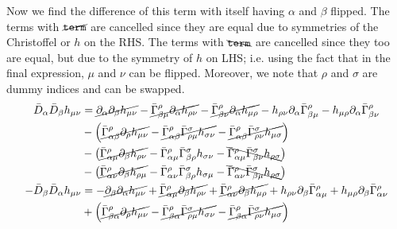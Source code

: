 \documentclass[12pt, letterpaper]{report}
\begin{document}
Now we find the difference of this term with itself having $\alpha$ and $\beta$ flipped. The terms with $\cancel{\texttt{term}}$ are cancelled since they are equal due to symmetries of the Christoffel or $h$ on the RHS. The terms with $\bcancel{\texttt{term}}$ are cancelled since they too are equal, but due to the symmetry of $h$ on LHS; i.e. using the fact that in the final expression, $\mu$ and $\nu$ can be flipped. Moreover, we note that $\rho$ and $\sigma$ are dummy indices and can be swapped.
\begin{align*}
    \bar{D}_\alpha \bar{D}_\beta h_{\mu\nu} &= \cancel{\partial_\alpha\partial_\beta h_{\mu\nu}}- \cancel{\bar{\Gamma}^{\rho}_{\beta \mu} \partial_\alpha h_{\rho\nu}}- \cancel{\bar{\Gamma}^{\rho}_{\beta \nu} \partial_\alpha h_{\mu\rho}}- h_{\rho\nu}\partial_\alpha\bar{\Gamma}^{\rho}_{\beta \mu}- h_{\mu\rho}\partial_\alpha \bar{\Gamma}^{\rho}_{\beta \nu}\\
    &- \qty(\cancel{\bar{\Gamma}^{\rho}_{\alpha \beta}\partial_\rho h_{\mu\nu}}- \cancel{\bar{\Gamma}^{\rho}_{\alpha \beta}\bar{\Gamma}^{\sigma}_{\rho \mu} h_{\sigma\nu}}- \cancel{\bar{\Gamma}^{\rho}_{\alpha \beta}\bar{\Gamma}^{\sigma}_{\rho \nu} h_{\mu\sigma}})\\
    &- \qty(\cancel{\bar{\Gamma}^{\rho}_{\alpha \mu}\partial_\beta h_{\rho\nu}}- \bar{\Gamma}^{\rho}_{\alpha \mu}\bar{\Gamma}^{\sigma}_{\beta \rho} h_{\sigma\nu}- \bcancel{\bar{\Gamma}^{\rho}_{\alpha \mu}\bar{\Gamma}^{\sigma}_{\beta \nu} h_{\rho\sigma}})\\
    &- \qty(\cancel{\bar{\Gamma}^{\rho}_{\alpha \nu}\partial_\beta h_{\rho\mu}}- \bar{\Gamma}^{\rho}_{\alpha \nu}\bar{\Gamma}^{\sigma}_{\beta \rho} h_{\sigma\mu}- \bcancel{\bar{\Gamma}^{\rho}_{\alpha \nu}\bar{\Gamma}^{\sigma}_{\beta \mu} h_{\rho\sigma}})\\
    -\bar{D}_\beta \bar{D}_\alpha h_{\mu\nu} &= -\cancel{\partial_\beta\partial_\alpha h_{\mu\nu}}+ \cancel{\bar{\Gamma}^{\rho}_{\alpha \mu} \partial_\beta h_{\rho\nu}}+ \cancel{\bar{\Gamma}^{\rho}_{\alpha \nu} \partial_\beta h_{\mu\rho}}+ h_{\rho\nu}\partial_\beta\bar{\Gamma}^{\rho}_{\alpha \mu}+ h_{\mu\rho}\partial_\beta \bar{\Gamma}^{\rho}_{\alpha \nu}\\
    &+ \qty(\cancel{\bar{\Gamma}^{\rho}_{\beta \alpha}\partial_\rho h_{\mu\nu}}- \cancel{\bar{\Gamma}^{\rho}_{\beta \alpha}\bar{\Gamma}^{\sigma}_{\rho \mu} h_{\sigma\nu}}- \cancel{\bar{\Gamma}^{\rho}_{\beta \alpha}\bar{\Gamma}^{\sigma}_{\rho \nu} h_{\mu\sigma}})\\

\end{align*}
\end{document}
